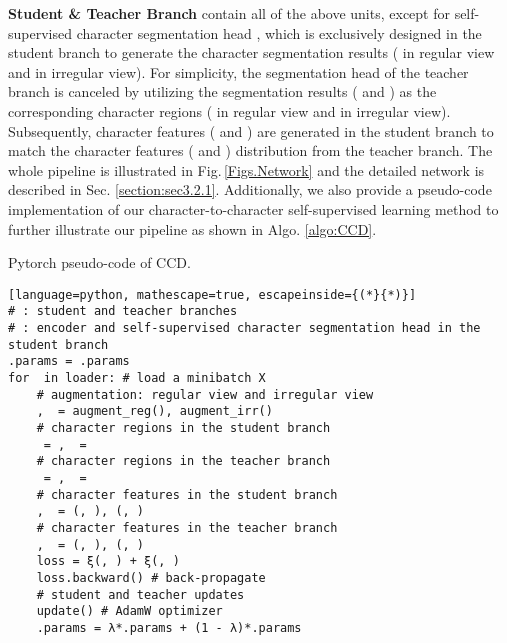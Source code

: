 \documentclass[10pt,twocolumn,letterpaper]{article}
\begin{document}
\noindent \textbf{Student \& Teacher Branch}
contain all of the above units, except for self-supervised character segmentation head , which is exclusively designed in the student branch to generate the character segmentation results ( in regular view and  in irregular view). 
For simplicity, the segmentation head of the teacher branch is canceled by utilizing the segmentation results ( and ) as the corresponding character regions ( in regular view and  in irregular view).
Subsequently, character features ( and ) are generated in the student branch to match the character features ( and ) distribution from the teacher branch. The whole pipeline is illustrated in Fig.\,\ref{Figs.Network} and the detailed network is described in Sec. \ref{section:sec3.2.1}.
Additionally, we also provide a pseudo-code implementation of our character-to-character self-supervised learning method to further illustrate our pipeline as shown in Algo. \ref{algo:CCD}.
\begin{algorithm}[t]
 \caption{Pytorch pseudo-code of CCD.}
 \vspace{-0.5em}
 \label{algo:CCD}
\centering
{}
\begin{lstlisting}[language=python, mathescape=true, escapeinside={(*}{*)}]
# : student and teacher branches
# : encoder and self-supervised character segmentation head in the student branch
.params = .params
for  in loader: # load a minibatch X
    # augmentation: regular view and irregular view
    ,  = augment_reg(), augment_irr()
    # character regions in the student branch
     = ,  = 
    # character regions in the teacher branch
     = ,  = 
    # character features in the student branch
    ,  = (, ), (, )
    # character features in the teacher branch
    ,  = (, ), (, )
    loss = ξ(, ) + ξ(, )
    loss.backward() # back-propagate
    # student and teacher updates
    update() # AdamW optimizer
    .params = λ*.params + (1 - λ)*.params
\end{lstlisting}
\vspace{-0.5em}
\end{algorithm}
\end{document}
